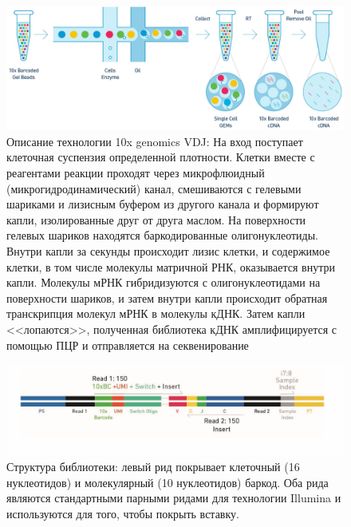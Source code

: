 \documentclass{spbau-diploma}
\begin{document}
\begin{figure}[h!]
    \centering
    \includegraphics[width=.9\textwidth]{figures/10x_pipeline.png}
    \caption{Описание технологии 10x genomics VDJ: На вход поступает клеточная суспензия определенной плотности. Клетки вместе с реагентами реакции проходят через микрофлюидный (микрогидродинамический) канал, смешиваются с гелевыми шариками и лизисным буфером из другого канала и формируют капли, изолированные друг от друга маслом. На поверхности гелевых шариков находятся баркодированные олигонуклеотиды. Внутри капли за секунды происходит лизис клетки, и содержимое клетки, в том числе молекулы матричной РНК, оказывается внутри капли. Молекулы мРНК гибридизуются с олигонуклеотидами на поверхности шариков, и затем внутри капли происходит обратная транскрипция молекул мРНК в молекулы кДНК. Затем капли <<лопаются>>, полученная библиотека кДНК амплифицируется с помощью ПЦР и отправляется на секвенирование}
    \label{10x_pipeline}
\end{figure}

\begin{figure}[h!]
    \centering
    \includegraphics[width=.9\textwidth]{figures/10x_barcodes.png}
    \caption{Структура библиотеки: левый рид покрывает клеточный (16 нуклеотидов) и молекулярный (10 нуклеотидов) баркод. Оба рида являются стандартными парными ридами для технологии Illumina и используются для того, чтобы покрыть вставку.}
    \label{10x_barcodes}
\end{figure}
\end{document}

